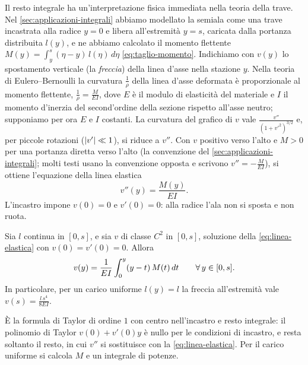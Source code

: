Il resto integrale ha un'interpretazione fisica immediata nella teoria della trave. Nel
\cref{sec:applicazioni-integrali} abbiamo modellato la semiala come una trave incastrata
alla radice $y=0$ e libera all'estremità $y=s$, caricata dalla portanza distribuita
$l(y)$, e ne abbiamo calcolato il momento flettente
$M(y)=\int_{y}^{s}(\eta-y)\,l(\eta)\,d\eta$ \eqref{eq:taglio-momento}. Indichiamo con $v(y)$ lo
spostamento verticale (la \emph{freccia}) della linea d'asse nella stazione $y$. Nella
teoria di Eulero--Bernoulli la curvatura $\frac1\rho$ della linea d'asse deformata è
proporzionale al momento flettente, $\frac1\rho=\frac M{EI}$, dove $E$ è il modulo di
elasticità del materiale e $I$ il momento d'inerzia del second'ordine della sezione
rispetto all'asse neutro; supponiamo per ora $E$ e $I$ costanti. La curvatura del grafico
di $v$ vale $\frac{v''}{(1+v'^{2})^{3/2}}$ e, per piccole rotazioni ($\lvert v'\rvert\ll1$), si riduce a $v''$.
Con $v$ positivo verso l'alto e $M>0$ per una portanza diretta verso l'alto (la
convenzione del \cref{sec:applicazioni-integrali}; molti testi usano la convenzione
opposta e scrivono $v''=-\frac M{EI}$), si ottiene l'equazione della linea elastica
\begin{equation}\label{eq:linea-elastica}
  v''(y)=\frac{M(y)}{EI} .
\end{equation}
L'incastro impone $v(0)=0$ e $v'(0)=0$: alla radice l'ala non si sposta e non ruota.

\begin{proposizione}\label{prop:freccia}
Sia $l$ continua in $[0,s]$, e sia $v$ di classe $C^{2}$ in $[0,s]$, soluzione della
\eqref{eq:linea-elastica} con $v(0)=v'(0)=0$. Allora
\begin{equation}\label{eq:freccia}
  v(y)=\frac1{EI}\int_{0}^{y}(y-t)\,M(t)\,dt \qquad\forall\, y\in[0,s] .
\end{equation}
In particolare, per un carico uniforme $l(y)=l$ la freccia all'estremità vale
$v(s)=\frac{l\,s^{4}}{8EI}$.
\end{proposizione}

\begin{schema}
\end{schema}

\begin{strategia}
È la formula di Taylor di ordine $1$ con centro nell'incastro e resto integrale: il
polinomio di Taylor $v(0)+v'(0)y$ è nullo per le condizioni di incastro, e resta soltanto
il resto, in cui $v''$ si sostituisce con la \eqref{eq:linea-elastica}. Per il carico
uniforme si calcola $M$ e un integrale di potenze.
\end{strategia}

